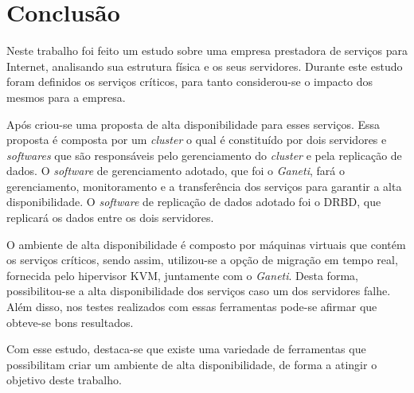 \chapter{Conclusão}
\label{cap:conclusao}

Neste trabalho foi feito um estudo sobre uma empresa prestadora de serviços para Internet, analisando sua estrutura física e os seus servidores. 
Durante este estudo foram definidos os serviços críticos, para tanto considerou-se o impacto dos mesmos para a empresa.

Após criou-se uma proposta de alta disponibilidade para esses serviços. Essa proposta é composta por um \textit{cluster} o qual é constituído 
por dois servidores e \textit{softwares} que são responsáveis pelo gerenciamento do \textit{cluster} e pela replicação de dados. O
\textit{software} de gerenciamento adotado, que foi o \textit{Ganeti}, fará o gerenciamento, monitoramento e a transferência dos serviços para 
garantir a alta disponibilidade. O \textit{software} de replicação de dados adotado foi o \ac{DRBD}, que replicará os dados entre 
os dois servidores.

O ambiente de alta disponibilidade é composto por máquinas virtuais que contém os serviços críticos, sendo assim, utilizou-se a opção de 
migração em tempo real, fornecida pelo hipervisor \ac{KVM}, juntamente com o \textit{Ganeti}. Desta forma, possibilitou-se a alta disponibilidade 
dos serviços caso um dos servidores falhe. Além disso, nos testes realizados com essas ferramentas pode-se afirmar que obteve-se bons resultados.

Com esse estudo, destaca-se que existe uma variedade de ferramentas que possibilitam criar um ambiente de alta disponibilidade, de forma a atingir 
o objetivo deste trabalho.




